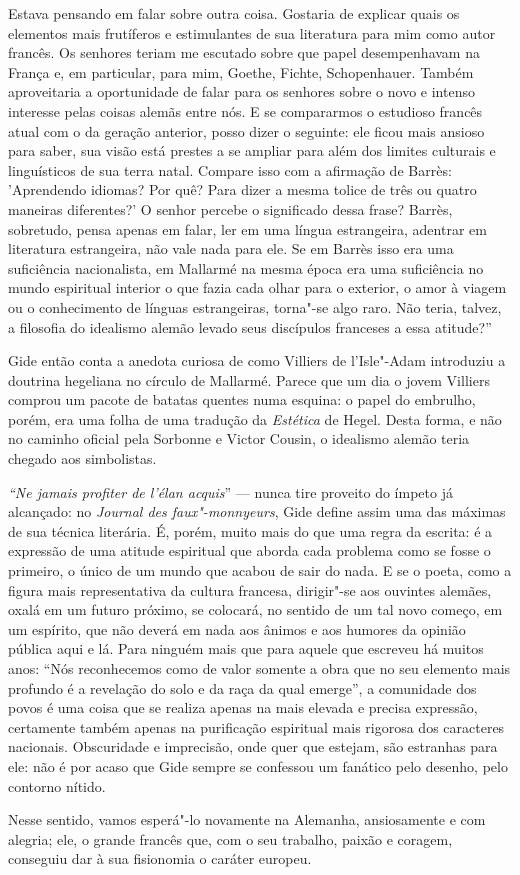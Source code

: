Estava pensando em falar sobre outra coisa. Gostaria de explicar quais
os elementos mais frutíferos e estimulantes de sua literatura para mim
como autor francês. Os senhores teriam me escutado sobre que papel
desempenhavam na França e, em particular, para mim, Goethe, Fichte,
Schopenhauer. Também aproveitaria a oportunidade de falar para os
senhores sobre o novo e intenso interesse pelas coisas alemãs entre nós.
E se compararmos o estudioso francês atual com o da geração anterior,
posso dizer o seguinte: ele ficou mais ansioso para saber, sua visão
está prestes a se ampliar para além dos limites culturais e linguísticos
de sua terra natal. Compare isso com a afirmação de Barrès: 'Aprendendo
idiomas? Por quê? Para dizer a mesma tolice de três ou quatro maneiras
diferentes?' O senhor percebe o significado dessa frase? Barrès,
sobretudo, pensa apenas em falar, ler em uma língua estrangeira,
adentrar em literatura estrangeira, não vale nada para ele. Se em Barrès
isso era uma suficiência nacionalista, em Mallarmé na mesma época era
uma suficiência no mundo espiritual interior o que fazia cada olhar para
o exterior, o amor à viagem ou o conhecimento de línguas estrangeiras,
torna"-se algo raro. Não teria, talvez, a filosofia do idealismo alemão
levado seus discípulos franceses a essa atitude?''

Gide então conta a anedota curiosa de como Villiers de l'Isle"-Adam
introduziu a doutrina hegeliana no círculo de Mallarmé. Parece que um
dia o jovem Villiers comprou um pacote de batatas quentes numa esquina:
o papel do embrulho, porém, era uma folha de uma tradução da
\emph{Estética} de Hegel. Desta forma, e não no caminho oficial pela
Sorbonne e Victor Cousin, o idealismo alemão teria chegado aos
simbolistas.

\emph{``Ne jamais profiter de l'élan acquis}'' --- nunca tire proveito do
ímpeto já alcançado: no \emph{Journal des faux"-monnyeurs}, Gide define
assim uma das máximas de sua técnica literária. É, porém, muito mais do
que uma regra da escrita: é a expressão de uma atitude espiritual que
aborda cada problema como se fosse o primeiro, o único de um mundo que
acabou de sair do nada. E se o poeta, como a figura mais representativa
da cultura francesa, dirigir"-se aos ouvintes alemães, oxalá em um futuro
próximo, se colocará, no sentido de um tal novo começo, em um espírito,
que não deverá em nada aos ânimos e aos humores da opinião pública aqui
e lá. Para ninguém mais que para aquele que escreveu há muitos anos:
``Nós reconhecemos como de valor somente a obra que no seu elemento mais
profundo é a revelação do solo e da raça da qual emerge'', a comunidade
dos povos é uma coisa que se realiza apenas na mais elevada e precisa
expressão, certamente também apenas na purificação espiritual mais
rigorosa dos caracteres nacionais. Obscuridade e imprecisão, onde quer
que estejam, são estranhas para ele: não é por acaso que Gide sempre se
confessou um fanático pelo desenho, pelo contorno nítido.

Nesse sentido, vamos esperá"-lo novamente na Alemanha, ansiosamente e com
alegria; ele, o grande francês que, com o seu trabalho, paixão e
coragem, conseguiu dar à sua fisionomia o caráter europeu.

